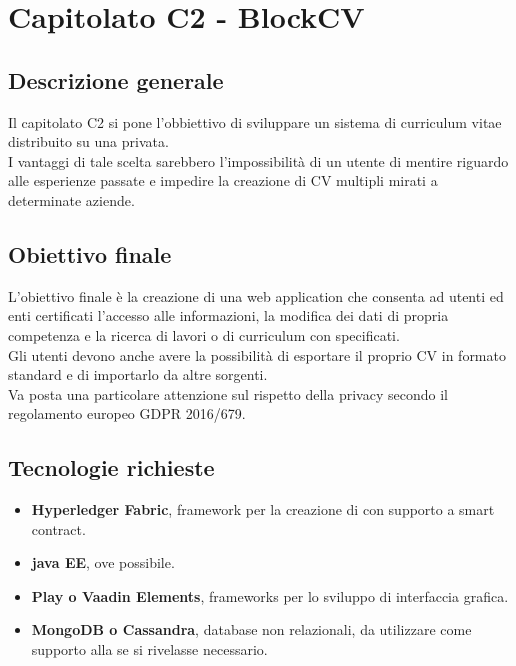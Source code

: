 \documentclass[StudioDiFattibilità.tex]{subfiles}
\begin{document}
\chapter{Capitolato C2 - BlockCV}
\section{Descrizione generale}
Il capitolato C2 si pone l'obbiettivo di sviluppare un sistema di curriculum vitae distribuito su una  privata.\\
I vantaggi di tale scelta sarebbero l'impossibilità di un utente di mentire riguardo alle esperienze passate e impedire la creazione di CV multipli mirati a determinate aziende.
\section{Obiettivo finale}
L'obiettivo finale è la creazione di una web application che consenta ad utenti ed enti certificati l'accesso alle informazioni, la modifica dei dati di propria competenza e la ricerca di lavori o di curriculum con  specificati.\\
Gli utenti devono anche avere la possibilità di esportare il proprio CV in formato standard e di importarlo da altre sorgenti.\\
Va posta una particolare attenzione sul rispetto della privacy secondo il regolamento europeo GDPR 2016/679.
\section{Tecnologie richieste}
\begin{itemize}
	\item \textbf{Hyperledger Fabric}, framework per la creazione di  con supporto a smart contract.
	\item \textbf{java EE}, ove possibile.
	\item \textbf{Play o Vaadin Elements}, frameworks per lo sviluppo di interfaccia grafica.
	\item \textbf{MongoDB o Cassandra}, database non relazionali, da utilizzare come supporto alla  se si rivelasse necessario.
\end{itemize}
\end{document}

